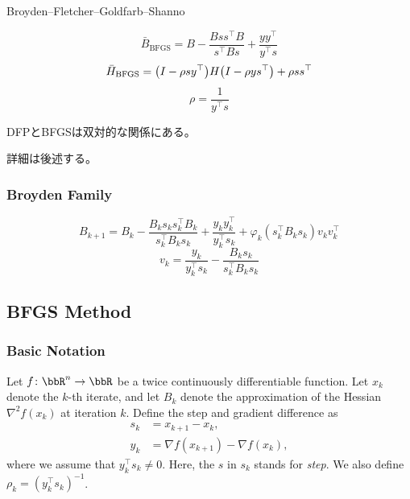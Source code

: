 \documentclass[a4paper, 10pt, dvipdfmx,draft]{article}
\begin{document}
Broyden--Fletcher--Goldfarb--Shanno

\cite{nocedal1999numerical}


\begin{equation*}
    \bar{B}_{\mathrm{BFGS}} = B - \frac{B s s^\top B}{s^\top B s} + \frac{y y^\top}{y^\top s}
\end{equation*}
\begin{equation*}
    \bar{H}_{\mathrm{BFGS}} = \qty(I - \rho s y^\top) H \qty(I - \rho y s^\top) + \rho s s^\top
\end{equation*}
\begin{equation*}
    \rho = \frac{1}{y^\top s}
\end{equation*}

DFPとBFGSは双対的な関係にある。

詳細は後述する。

\subsubsection{Broyden Family}
\begin{equation*}
    B_{k+1} = B_k - \frac{B_k s_k s_k^\top B_k}{s_k^\top B_k s_k} + \frac{y_k y_k^\top}{y_k^\top s_k} + \varphi_k (s_k^\top B_k s_k) v_k v_k^\top
\end{equation*}
\begin{equation*}
    v_k = \frac{y_k}{y_k^\top s_k} - \frac{B_k s_k}{s_k^\top B_k s_k}
\end{equation*}

\subsection{BFGS Method}

\subsubsection{Basic Notation}

Let $f\colon \bbR^n \to \bbR$ be a twice continuously differentiable function.
Let $x_k$ denote the $k$-th iterate, and let $B_k$ denote the approximation of the Hessian $\nabla^2 f(x_k)$ at iteration $k$.
Define the step and gradient difference as
\begin{align}
    s_k & = x_{k+1} - x_k, \label{eq:step}                              \\
    y_k & = \nabla f(x_{k+1}) - \nabla f(x_k), \label{eq:gradient_diff}
\end{align}
where we assume that $y_k^\top s_k \neq 0$.
Here, the $s$ in $s_k$ stands for \emph{step}.
We also define $\rho_k = (y_k^\top s_k)^{-1}$.
\end{document}
